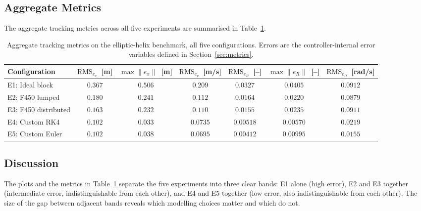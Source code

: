 \documentclass[11pt]{article}
\theoremstyle{remark}
\begin{document}
\subsection{Aggregate Metrics}
\label{sec:cross-experiment}

The aggregate tracking metrics across all five experiments are summarised in Table~\ref{tab:metrics-summary}.

\begin{table}[H]
    \centering
    \caption{Aggregate tracking metrics on the elliptic-helix benchmark, all five configurations. Errors are the controller-internal error variables defined in Section~\ref{sec:metrics}.}
    \label{tab:metrics-summary}
    \footnotesize
    \renewcommand{\arraystretch}{1.2}
    \begin{tabular}{@{}lcccccc@{}}
        \toprule
        Configuration & $\mathrm{RMS}_{e_x}$~[m] & $\max\|e_x\|$~[m] & $\mathrm{RMS}_{e_v}$~[m/s] & $\mathrm{RMS}_{e_R}$~[--] & $\max\|e_R\|$~[--] & $\mathrm{RMS}_{e_\Omega}$~[rad/s] \\
        \midrule
        E1: Ideal block      & $0.367$ & $0.506$ & $0.209$ & $0.0327$ & $0.0405$ & $0.0912$ \\
        E2: F450 lumped      & $0.180$ & $0.241$ & $0.112$ & $0.0164$ & $0.0220$ & $0.0879$ \\
        E3: F450 distributed & $0.163$ & $0.232$ & $0.110$ & $0.0155$ & $0.0235$ & $0.0911$ \\
        E4: Custom RK4       & $0.102$ & $0.033$ & $0.0735$ & $0.00518$ & $0.00570$ & $0.0219$ \\
        E5: Custom Euler     & $0.102$ & $0.038$ & $0.0695$ & $0.00412$ & $0.00995$ & $0.0155$ \\
        \bottomrule
    \end{tabular}
\end{table}

\subsection{Discussion}
\label{sec:results-discussion}

The plots and the metrics in Table~\ref{tab:metrics-summary} separate the five experiments into three clear bands: E1 alone (high error), E2 and E3 together (intermediate error, indistinguishable from each other), and E4 and E5 together (low error, also indistinguishable from each other). The size of the gap between adjacent bands reveals which modelling choices matter and which do not.
\end{document}

